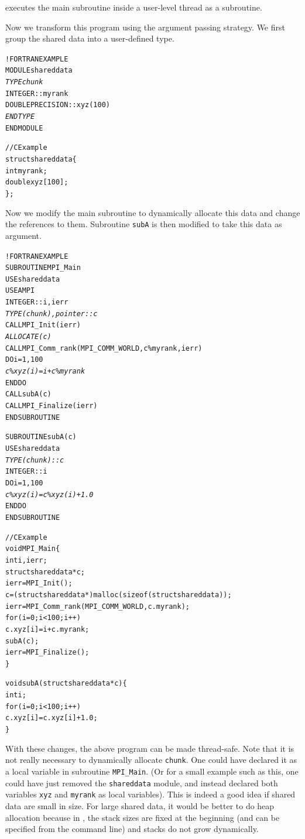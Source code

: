 \documentclass[10pt]{article}
\begin{document}
\ampi{} executes the main subroutine inside a user-level thread as a subroutine.
 
Now we transform this program using the argument passing strategy. We first group the
shared data into a user-defined type.

\begin{alltt}
!FORTRAN EXAMPLE
MODULE shareddata
  \emph{TYPE chunk}
    INTEGER :: myrank
    DOUBLE PRECISION :: xyz(100)
  \emph{END TYPE}
END MODULE

//C Example
struct shareddata\{
  int myrank;
  double xyz[100];
\};
\end{alltt}

Now we modify the main subroutine to dynamically allocate this data and change the
references to them. Subroutine \texttt{subA} is then modified to take this data
as argument. 

\begin{alltt}
!FORTRAN EXAMPLE
SUBROUTINE MPI_Main
  USE shareddata
  USE AMPI
  INTEGER :: i, ierr
  \emph{TYPE(chunk), pointer :: c}
  CALL MPI_Init(ierr)
  \emph{ALLOCATE(c)}
  CALL MPI_Comm_rank(MPI_COMM_WORLD, c\%myrank, ierr)
  DO i = 1, 100
    \emph{c\%xyz(i) =  i + c\%myrank}
  END DO
  CALL subA(c)
  CALL MPI_Finalize(ierr)
END SUBROUTINE

SUBROUTINE subA(c)
  USE shareddata
  \emph{TYPE(chunk) :: c}
  INTEGER :: i
  DO i = 1, 100
    \emph{c\%xyz(i) = c\%xyz(i) + 1.0}
  END DO
END SUBROUTINE

//C Example
void MPI_Main\{
  int i,ierr;
  struct shareddata *c;
  ierr = MPI_Init();
  c = (struct shareddata*)malloc(sizeof(struct shareddata));
  ierr = MPI_Comm_rank(MPI_COMM_WORLD, c.myrank);
  for(i=0;i<100;i++)
    c.xyz[i] = i + c.myrank;
  subA(c);
  ierr = MPI_Finalize();
\}

void subA(struct shareddata *c)\{
  int i;
  for(i=0;i<100;i++)
    c.xyz[i] = c.xyz[i] + 1.0;
\}
\end{alltt}

With these changes, the above program can be made thread-safe. Note that it is
not really necessary to dynamically allocate \texttt{chunk}. One could have
declared it as a local variable in subroutine \texttt{MPI\_Main}.  (Or for a
small example such as this, one could have just removed the \texttt{shareddata}
module, and instead declared both variables \texttt{xyz} and \texttt{myrank} as
local variables). This is indeed a good idea if shared data are small in size.
For large shared data, it would be better to do heap allocation because in
\ampi{}, the stack sizes are fixed at the beginning (and can be specified from the
command line) and stacks do not grow dynamically.
\end{document}
